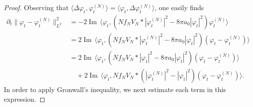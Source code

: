 \documentclass[11pt,a4paper]{scrartcl}
\renewcommand{\Im}{\operatorname{Im}\,} 	%
\begin{document}
\begin{proof}
  Observing that $\langle \Delta \varphi_t, \varphi_t^{(N)} \rangle = \langle
  \varphi_t, \Delta \varphi_t^{(N)} \rangle$, one easily finds
  \begin{equation}
    \label{ddt}
    \begin{aligned}
      \partial_t \| \varphi_t - \varphi_t^{(N)} \|_{L^2}^2 & = -2 \Im \langle
      \varphi_t, (N f_N V_N * |\varphi_t^{(N)}|^2 - 8 \pi a_0 |\varphi_t|^2)
      \varphi_t^{(N)} \rangle \\
      & = 2 \Im \langle \varphi_t, (N f_N V_N * |\varphi_t^{(N)}|^2 - 8 \pi
      a_0 |\varphi_t|^2) (\varphi_t - \varphi_t^{(N)}) \rangle \\
      & = 2 \Im \langle \varphi_t, (N f_N V_N * |\varphi_t|^2 - 8 \pi a_0
      |\varphi_t|^2) (\varphi_t - \varphi_t^{(N)}) \rangle \\
      & \quad + 2 \Im \langle \varphi_t, N f_N V_N * (|\varphi_t^{(N)}|^2 -
      |\varphi_t|^2) (\varphi_t - \varphi_t^{(N)}) \rangle.
    \end{aligned}
  \end{equation}
  In order to apply Gronwall's inequality, we next estimate each term in this
  expression.



\end{proof}
\end{document}
